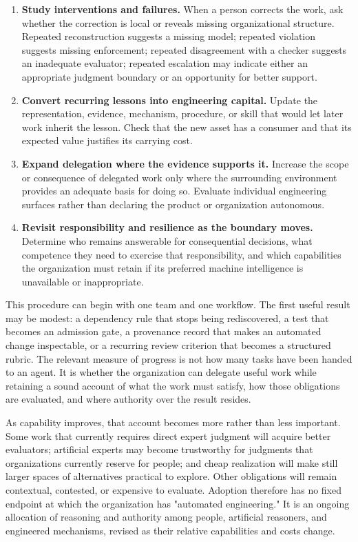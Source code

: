 \begin{enumerate}
\item
  \textbf{Study interventions and failures.} When a person corrects the work, ask whether the correction is local or reveals missing organizational structure. Repeated reconstruction suggests a missing model; repeated violation suggests missing enforcement; repeated disagreement with a checker suggests an inadequate evaluator; repeated escalation may indicate either an appropriate judgment boundary or an opportunity for better support.
\item
  \textbf{Convert recurring lessons into engineering capital.} Update the representation, evidence, mechanism, procedure, or skill that would let later work inherit the lesson. Check that the new asset has a consumer and that its expected value justifies its carrying cost.
\item
  \textbf{Expand delegation where the evidence supports it.} Increase the scope or consequence of delegated work only where the surrounding environment provides an adequate basis for doing so. Evaluate individual engineering surfaces rather than declaring the product or organization autonomous.
\item
  \textbf{Revisit responsibility and resilience as the boundary moves.} Determine who remains answerable for consequential decisions, what competence they need to exercise that responsibility, and which capabilities the organization must retain if its preferred machine intelligence is unavailable or inappropriate.
\end{enumerate}

This procedure can begin with one team and one workflow. The first useful result may be modest: a dependency rule that stops being rediscovered, a test that becomes an admission gate, a provenance record that makes an automated change inspectable, or a recurring review criterion that becomes a structured rubric. The relevant measure of progress is not how many tasks have been handed to an agent. It is whether the organization can delegate useful work while retaining a sound account of what the work must satisfy, how those obligations are evaluated, and where authority over the result resides.

As capability improves, that account becomes more rather than less important. Some work that currently requires direct expert judgment will acquire better evaluators; artificial experts may become trustworthy for judgments that organizations currently reserve for people; and cheap realization will make still larger spaces of alternatives practical to explore. Other obligations will remain contextual, contested, or expensive to evaluate. Adoption therefore has no fixed endpoint at which the organization has "automated engineering." It is an ongoing allocation of reasoning and authority among people, artificial reasoners, and engineered mechanisms, revised as their relative capabilities and costs change.

